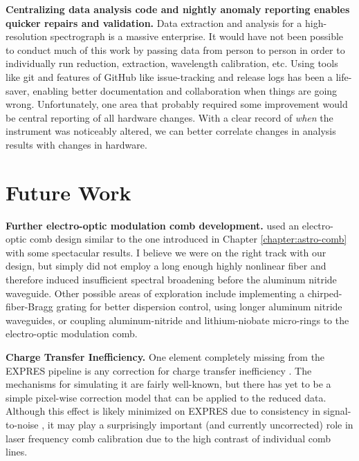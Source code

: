 \textbf{Centralizing data analysis code and nightly anomaly reporting enables quicker repairs and validation.} Data extraction and analysis for a high-resolution spectrograph is a massive enterprise. It would have not been possible to conduct much of this work by passing data from person to person in order to individually run reduction, extraction, wavelength calibration, etc. Using tools like git and features of GitHub like issue-tracking and release logs has been a life-saver, enabling better documentation and collaboration when things are going wrong. Unfortunately, one area that probably required some improvement would be central reporting of all hardware changes. With a clear record of \textit{when} the instrument was noticeably altered, we can better correlate changes in analysis results with changes in hardware.

\section{Future Work} \label{conclusion:future}

\textbf{Further electro-optic modulation comb development.} \citet{obrzud_visible_2019} used an electro-optic comb design similar to the one introduced in Chapter \ref{chapter:astro-comb} with some spectacular results. I believe we were on the right track with our design, but simply did not employ a long enough highly nonlinear fiber and therefore induced insufficient spectral broadening before the aluminum nitride waveguide. Other possible areas of exploration include implementing a chirped-fiber-Bragg grating for better dispersion control, using longer aluminum nitride waveguides, or coupling aluminum-nitride and lithium-niobate micro-rings to the electro-optic modulation comb.

\textbf{Charge Transfer Inefficiency.} One element completely missing from the EXPRES pipeline is any correction for charge transfer inefficiency \citep{goudfrooij_empirical_2006, bouchy_charge_2009, blake_impact_2017}. The mechanisms for simulating it are fairly well-known, but there has yet to be a simple pixel-wise correction model that can be applied to the reduced data. Although this effect is likely minimized on EXPRES due to consistency in signal-to-noise \citep{blackman_performance_2020}, it may play a surprisingly important (and currently uncorrected) role in laser frequency comb calibration due to the high contrast of individual comb lines.

